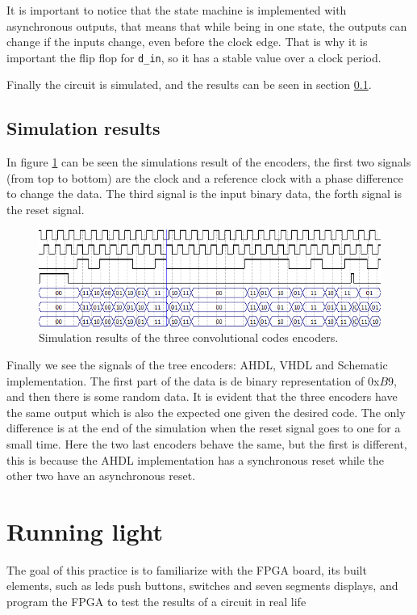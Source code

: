 \documentclass[12pt]{article}   	%
\begin{document}
It is important to notice that the state machine is implemented with asynchronous outputs, that means that while being in one state, the outputs can change if the inputs change, even before the clock edge. That is why it is important the flip flop for \lstinline{d_in}, so it has a stable value over a clock period.

Finally the circuit is simulated, and the results can be seen in section \ref{sec:conv_code_results}.


\subsection{Simulation results}
\label{sec:conv_code_results}

In figure \ref{fig:sim_conv_code} can be seen the simulations result of the encoders, the first two signals (from top to bottom) are the clock and a reference clock with a phase difference to change the data. The third signal is the input binary data, the forth signal is the reset signal.

\begin{figure}[htbp]
\begin{center}
\includegraphics[width=\textwidth]{img/conv_code_comp_sim}
\caption{Simulation results of the three convolutional codes encoders.}
\label{fig:sim_conv_code}
\end{center}
\end{figure}


Finally we see the signals of the tree encoders: AHDL, VHDL and Schematic implementation. The first part of the data is de binary representation of 0x$B9$, and then there is some random data. It is evident that the three encoders have the same output which is also the expected one given the desired code. The only difference is at the end of the simulation when the reset signal goes to one for a small time. Here the two last encoders behave the same, but the first is different, this is because the AHDL implementation has a synchronous reset while the other two have an asynchronous reset.




\section{Running light}
The goal of this practice is to familiarize with the FPGA board, its built elements, such as leds push buttons, switches and seven segments displays, and program the FPGA to test the results of a circuit in real life
\end{document}
